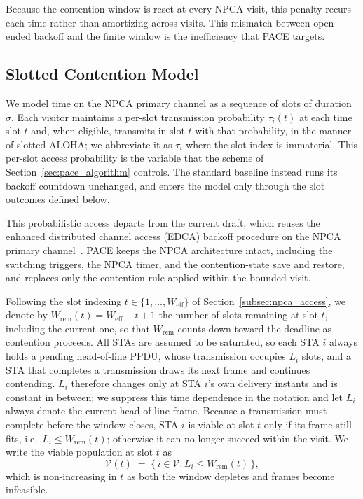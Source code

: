 \documentclass[a4paper,fleqn]{cas-dc}
\begin{document}
Because the contention window is reset at every NPCA visit, this penalty recurs each time rather than amortizing across visits. This mismatch between open-ended backoff and the finite window is the inefficiency that PACE targets.

\subsection{Slotted Contention Model}
\label{subsec:npca_window}

We model time on the NPCA primary channel as a sequence of slots of duration $\sigma$. Each visitor maintains a per-slot transmission probability $\tau_i(t)$ at each time slot $t$ and, when eligible, transmits in slot $t$ with that probability, in the manner of slotted ALOHA; we abbreviate it as $\tau_i$ where the slot index is immaterial. This per-slot access probability is the variable that the scheme of Section~\ref{sec:pace_algorithm} controls. The standard baseline instead runs its backoff countdown unchanged, and enters the model only through the slot outcomes defined below.

This probabilistic access departs from the current draft, which reuses
the enhanced distributed channel access (EDCA) backoff procedure on the NPCA primary channel~\citep{ieee80211bn}. PACE keeps the NPCA architecture intact, including the switching triggers, the NPCA timer, and the contention-state save and restore, and replaces only the contention rule applied within the bounded visit. 

Following the slot indexing $t\in\{1,\dots,W_\mathrm{eff}\}$ of Section~\ref{subsec:npca_access}, we denote by $W_\mathrm{rem}(t)=W_\mathrm{eff}-t+1$ the number of slots remaining at slot $t$, including the current one, so that $W_\mathrm{rem}$ counts down toward the deadline as contention proceeds. All STAs are assumed to be saturated, so each STA $i$ always holds a pending head-of-line PPDU, whose transmission occupies $L_i$ slots, and a STA that completes a transmission draws its next frame and continues contending. $L_i$ therefore changes only at STA $i$'s own delivery instants and is constant in between; we suppress this time dependence in the notation and let $L_i$ always denote the current head-of-line frame. Because a transmission must complete before the window closes, STA $i$ is viable at slot $t$ only if its frame still fits, i.e.\ $L_i \le W_\mathrm{rem}(t)$; otherwise it can no longer succeed within the visit. We write the viable population at slot $t$ as
\begin{equation}
    \mathcal{V}(t) \;=\; \bigl\{\, i\in\mathcal{V} :
    L_i \le W_\mathrm{rem}(t) \,\bigr\},
    \label{eq:viable}
\end{equation}
which is non-increasing in $t$ as both the window depletes and frames become infeasible.
\end{document}
